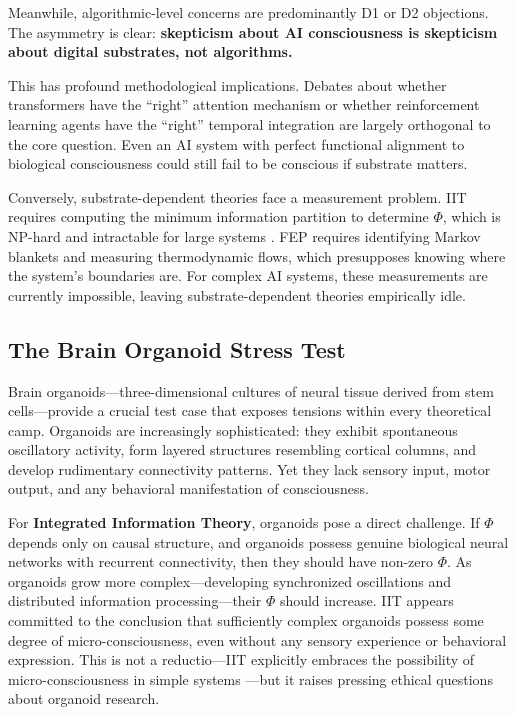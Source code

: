 Meanwhile, algorithmic-level concerns are predominantly D1 or D2 objections. The asymmetry
is clear: \textbf{skepticism about AI consciousness is skepticism about digital substrates,
not algorithms.}

This has profound methodological implications. Debates about whether transformers have the
``right'' attention mechanism or whether reinforcement learning agents have the ``right''
temporal integration are largely orthogonal to the core question. Even an AI system with
perfect functional alignment to biological consciousness could still fail to be conscious if
substrate matters.

Conversely, substrate-dependent theories face a measurement problem. IIT requires computing
the minimum information partition to determine $\Phi$, which is NP-hard and intractable for
large systems \cite{oizumi2014phenomenology}. FEP requires identifying Markov blankets and
measuring thermodynamic flows, which presupposes knowing where the system's boundaries are.
For complex AI systems, these measurements are currently impossible, leaving substrate-dependent
theories empirically idle.

\subsection{The Brain Organoid Stress Test}

Brain organoids---three-dimensional cultures of neural tissue derived from stem cells---provide
a crucial test case that exposes tensions within every theoretical camp. Organoids are
increasingly sophisticated: they exhibit spontaneous oscillatory activity, form layered
structures resembling cortical columns, and develop rudimentary connectivity patterns. Yet they
lack sensory input, motor output, and any behavioral manifestation of consciousness.

For \textbf{Integrated Information Theory}, organoids pose a direct challenge. If $\Phi$
depends only on causal structure, and organoids possess genuine biological neural networks
with recurrent connectivity, then they should have non-zero $\Phi$. As organoids grow more
complex---developing synchronized oscillations and distributed information processing---their
$\Phi$ should increase. IIT appears committed to the conclusion that sufficiently complex
organoids possess some degree of micro-consciousness, even without any sensory experience or
behavioral expression. This is not a reductio---IIT explicitly embraces the possibility of
micro-consciousness in simple systems \cite{tononi2016integrated}---but it raises pressing
ethical questions about organoid research.

